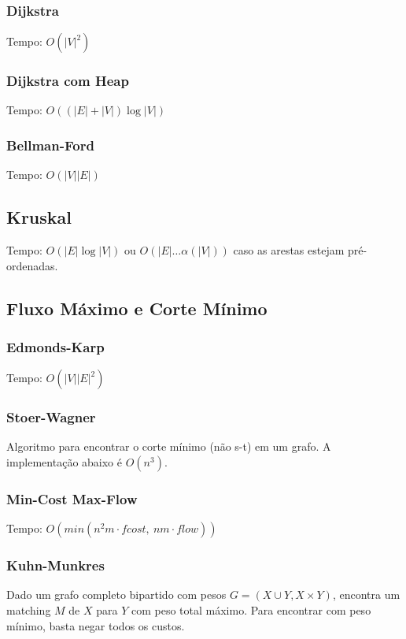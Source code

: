 \documentclass[12pt,a4paper]{article}
\begin{document}
			\subsubsection{Dijkstra}
				Tempo: \( O(|V|^2) \)
				
			\subsubsection{Dijkstra com Heap}
				Tempo: \( O((|E| + |V|) \log |V|) \)
				
			\subsubsection{Bellman-Ford}
				Tempo: \( O(|V| |E|) \)
				
		\subsection{Kruskal}
			Tempo: \( O(|E| \log |V|) \) ou \( O(|E| \ldots \alpha(|V|)) \) caso as arestas estejam pré-ordenadas.
			
		\subsection{Fluxo Máximo e Corte Mínimo}
			\subsubsection{Edmonds-Karp}
				Tempo: \( O(|V| |E|^2) \)
				
			\subsubsection{Stoer-Wagner}
				Algoritmo para encontrar o corte mínimo (não s-t) em um grafo. A implementação abaixo é \(O(n^3)\).
				
			\subsubsection{Min-Cost Max-Flow}
				Tempo: \( O(min(n^2 m \cdot fcost, ~ n m \cdot flow) ) \)
				
			\subsubsection{Kuhn-Munkres}
				Dado um grafo completo bipartido com pesos $ G = (X \cup Y, X \times Y) $, encontra um matching $M$ de $X$ para $Y$ com peso total máximo. Para encontrar com peso mínimo, basta negar todos os custos.
\end{document}
